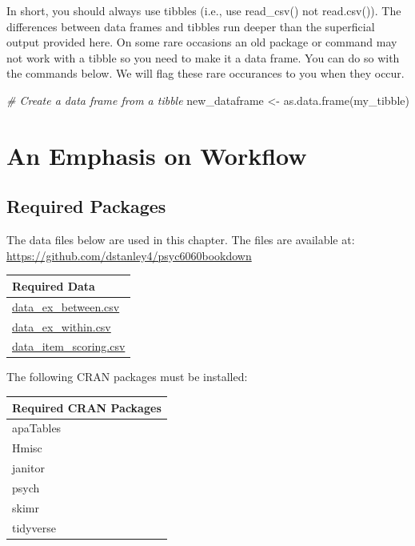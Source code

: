 \documentclass[
]{krantz}
\makeatletter
\newenvironment{Shaded}{\begin{snugshade}}{\end{snugshade}}
\newcommand{\CommentTok}[1]{\textcolor[rgb]{0.37,0.37,0.37}{\textit{#1}}}
\newcommand{\FunctionTok}[1]{\textcolor[rgb]{0,0,0}{#1}}
\newcommand{\NormalTok}[1]{#1}
\newcommand{\OtherTok}[1]{\textcolor[rgb]{0.37,0.37,0.37}{#1}}
\newenvironment{kframe}{%
\medskip{}
\setlength{\fboxsep}{.8em}
 \def\at@end@of@kframe{}%
 \ifinner\ifhmode%
  \def\at@end@of@kframe{\end{minipage}}%
  \begin{minipage}{\columnwidth}%
 \fi\fi%
 \def\FrameCommand##1{\hskip\@totalleftmargin \hskip-\fboxsep
 \colorbox{shadecolor}{##1}\hskip-\fboxsep
     \hskip-\linewidth \hskip-\@totalleftmargin \hskip\columnwidth}%
 \MakeFramed {\advance\hsize-\width
   \@totalleftmargin\z@ \linewidth\hsize
   \@setminipage}}%
 {\par\unskip\endMakeFramed%
 \at@end@of@kframe}
\renewenvironment{Shaded}{\begin{kframe}}{\end{kframe}}
\makeatother
\begin{document}
In short, you should always use tibbles (i.e., use read\_csv() not read.csv()). The differences between data frames and tibbles run deeper than the superficial output provided here. On some rare occasions an old package or command may not work with a tibble so you need to make it a data frame. You can do so with the commands below. We will flag these rare occurances to you when they occur.

\begin{Shaded}
\begin{Highlighting}[]
\CommentTok{\# Create a data frame from a tibble}
\NormalTok{new\_dataframe }\OtherTok{\textless{}{-}} \FunctionTok{as.data.frame}\NormalTok{(my\_tibble)}
\end{Highlighting}
\end{Shaded}

\hypertarget{an-emphasis-on-workflow}{%
\chapter{An Emphasis on Workflow}\label{an-emphasis-on-workflow}}

\hypertarget{required-packages}{%
\section{Required Packages}\label{required-packages}}

The data files below are used in this chapter. The files are available at: \url{https://github.com/dstanley4/psyc6060bookdown}

\begin{longtable}[]{@{}l@{}}
\toprule
Required Data \\
\midrule
\endhead
\url{data_ex_between.csv} \\
\url{data_ex_within.csv} \\
\url{data_item_scoring.csv} \\
\bottomrule
\end{longtable}

The following CRAN packages must be installed:

\begin{longtable}[]{@{}l@{}}
\toprule
Required CRAN Packages \\
\midrule
\endhead
apaTables \\
Hmisc \\
janitor \\
psych \\
skimr \\
tidyverse \\
\bottomrule
\end{longtable}
\end{document}

